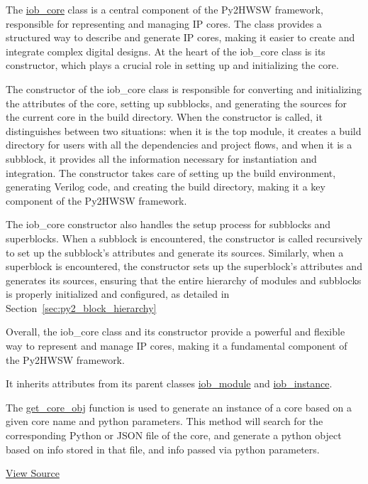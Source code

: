 %

The \href{https://github.com/IObundle/py2hwsw/blob/main/py2hwsw/scripts/iob_core.py}{iob\_core} class is a central component of the Py2HWSW framework, responsible for representing and managing IP cores. The class provides a structured way to describe and generate IP cores, making it easier to create and integrate complex digital designs. At the heart of the iob\_core class is its constructor, which plays a crucial role in setting up and initializing the core.

The constructor of the iob\_core class is responsible for converting and initializing the attributes of the core, setting up subblocks, and generating the sources for the current core in the build directory. When the constructor is called, it distinguishes between two situations: when it is the top module, it creates a build directory for users with all the dependencies and project flows, and when it is a subblock, it provides all the information necessary for instantiation and integration. The constructor takes care of setting up the build environment, generating Verilog code, and creating the build directory, making it a key component of the Py2HWSW framework.

The iob\_core constructor also handles the setup process for subblocks and superblocks. When a subblock is encountered, the constructor is called recursively to set up the subblock's attributes and generate its sources. Similarly, when a superblock is encountered, the constructor sets up the superblock's attributes and generates its sources, ensuring that the entire hierarchy of modules and subblocks is properly initialized and configured, as detailed in Section~\ref{sec:py2_block_hierarchy}

Overall, the iob\_core class and its constructor provide a powerful and flexible way to represent and manage IP cores, making it a fundamental component of the Py2HWSW framework.

It inherits attributes from its parent classes \href{https://github.com/IObundle/py2hwsw/blob/main/py2hwsw/scripts/iob_module.py}{iob\_module} and \href{https://github.com/IObundle/py2hwsw/blob/main/py2hwsw/scripts/iob_instance.py}{iob\_instance}.


The \href{https://github.com/IObundle/py2hwsw/blob/main/py2hwsw/scripts/iob_core.py#L858}{get\_core\_obj} function is used to generate an instance of a core based on a given core name and python parameters.
This method will search for the corresponding Python or JSON file of the core, and generate a python object based on info stored in that file, and info passed via python parameters.

\href{https://github.com/IObundle/py2hwsw/blob/main/py2hwsw/scripts/iob_core.py}{View Source}
